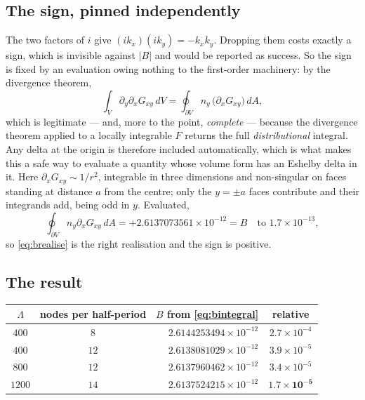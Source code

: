 \documentclass[11pt,a4paper]{article}
\begin{document}
\subsection{The sign, pinned independently}

The two factors of $i$ give $(ik_x)(ik_y) = -k_xk_y$.  Dropping them costs
exactly a sign, which is invisible against $|B|$ and would be reported as
success.  So the sign is fixed by an evaluation owing nothing to the first-order
machinery: by the divergence theorem,
\begin{equation}\label{eq:bsurface}
  \int_V \partial_y\partial_x G_{xy}\,dV
  = \oint_{\partial V} n_y\,\bigl(\partial_x G_{xy}\bigr)\,dA ,
\end{equation}
which is legitimate --- and, more to the point, \emph{complete} --- because the
divergence theorem applied to a locally integrable $F$ returns the full
\emph{distributional} integral.  Any delta at the origin is therefore included
automatically, which is what makes this a safe way to evaluate a quantity whose
volume form has an Eshelby delta in it.  Here $\partial_x G_{xy} \sim 1/r^2$,
integrable in three dimensions and non-singular on faces standing at distance $a$
from the centre; only the $y=\pm a$ faces contribute and their integrands add,
being odd in $y$.  Evaluated,
\begin{equation}
  \oint_{\partial V} n_y \partial_x G_{xy}\,dA = +2.6137073561\times10^{-12}
  = B \quad\text{to } 1.7\times10^{-13},
\end{equation}
so \eqref{eq:brealise} is the right realisation and the sign is positive.

\subsection{The result}

\begin{center}
\begin{tabular}{ccrc}
\toprule
$\Lambda$ & nodes per half-period & $B$ from \eqref{eq:bintegral} & relative\\
\midrule
$400$  & $8$  & $2.6144253494\times10^{-12}$ & $2.7\times10^{-4}$\\
$400$  & $12$ & $2.6138081029\times10^{-12}$ & $3.9\times10^{-5}$\\
$800$  & $12$ & $2.6137960462\times10^{-12}$ & $3.4\times10^{-5}$\\
$1200$ & $14$ & $2.6137524215\times10^{-12}$ & $\mathbf{1.7\times10^{-5}}$\\
\bottomrule
\end{tabular}
\end{center}
\end{document}
